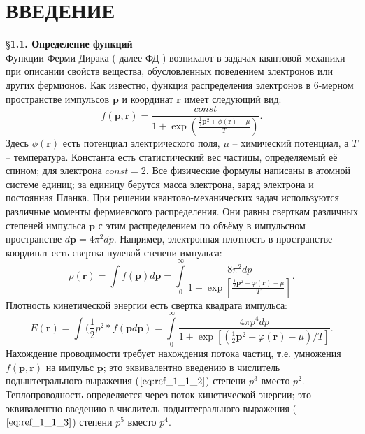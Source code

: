 \chapter{ВВЕДЕНИЕ}

\S \textbf{1.1. Определение функций}
\\

Функции Ферми-Дирака ( далее ФД ) возникают в задачах квантовой механики при описании свойств вещества, обусловленных поведением электронов или других фермионов. Как известно, функция распределения электронов в 6-мерном пространстве импульсов $\textbf{p}$ и координат $\textbf{r}$ имеет следующий вид:
\begin{equation}
f(\textbf{p},\textbf{r})=\frac{const}{1+\exp{(\frac{\frac{1}{2}\textbf{p}^2+\phi(\textbf{r})-\mu}{T})}}.
\label{eq:ref_1_1_1}
\end{equation}
Здесь $\phi(\textbf{r})$ есть потенциал электрического поля, $\mu$ – химический потенциал, а $T$ – температура. Константа есть статистический вес частицы, определяемый её спином; для электрона $const = 2$. Все физические формулы написаны в атомной системе единиц; за единицу берутся масса электрона, заряд электрона и постоянная Планка.
\indent
\newline
При решении квантово-механических задач используются различные моменты фермиевского распределения. Они равны сверткам различных степеней импульса $\textbf{p}$ с этим распределением по объёму в импульсном пространстве $d\textbf{p}=4\pi^2dp$. Например, электронная плотность в пространстве координат есть свертка нулевой степени импульса:
\begin{equation}
\rho (\textbf{r}) = \int f(\textbf{p}) d \textbf{p} = \int\limits_0^{\infty} \frac{8\pi^2 dp}{1 +\exp[\frac{\frac{1}{2} \textbf{p}^2 + \varphi(\textbf{r}) - \mu}{T}]}.
\label{eq:ref_1_1_2}
\end{equation}
Плотность кинетической энергии есть свертка квадрата импульса:
\begin{equation}
E(\textbf{r}) = \int(\frac{1}{2}p^2*f(\textbf{p}d\textbf{p}) = \int\limits_0^{\infty} \frac{4\pi p^4dp}{1+\exp[(\frac{1}{2}\textbf{p}^2 + \varphi(\textbf{r}) - \mu) / T]}.
\label{eq:ref_1_1_3}
\end{equation}
Нахождение проводимости требует нахождения потока частиц, т.е. умножения $f(\textbf{p}, \textbf{r})$ на импульс $\textbf{p}$; это эквивалентно введению в числитель подынтегрального выражения ($\ref{eq:ref_1_1_2}$) степени $p^3$ вместо $p^2$. Теплопроводность определяется через поток кинетической энергии; это эквивалентно введению в числитель подынтегрального выражения ($\ref{eq:ref_1_1_3}$) степени $p^5$ вместо $p^4$.

